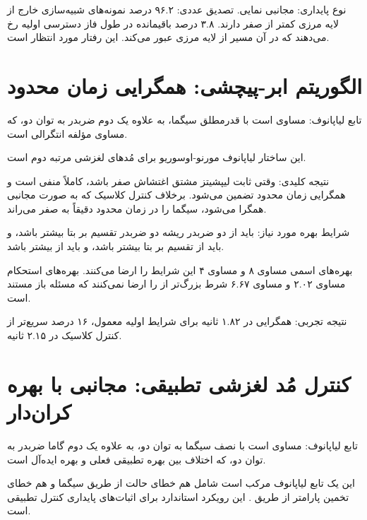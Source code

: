 \documentclass[12pt, a4paper]{article}
\newcommand{\dash}{\lr{---}}
\begin{document}
نوع پايداری: مجانبی نمايی. تصديق عددی: ۹۶.۲ درصد نمونه‌های شبيه‌سازی خارج از لايه مرزی  کمتر از صفر دارند. ۳.۸ درصد باقيمانده در طول فاز دسترسی اوليه رخ می‌دهند که در آن مسير از لايه مرزی عبور می‌کند. اين رفتار مورد انتظار است.

\section{الگوريتم ابر-پيچشی: همگرايی زمان محدود}

تابع لياپانوف:  مساوی است با قدرمطلق سيگما، به علاوه يک دوم  ضربدر  به توان دو، که  مساوی  مؤلفه انتگرالی است.

اين ساختار لياپانوف مورنو-اوسوريو برای مُدهای لغزشی مرتبه دوم است.

نتيجه کليدی: وقتی  \dash{} ثابت ليپشيتز مشتق اغتشاش \dash{} صفر باشد،  کاملاً منفی است و همگرايی زمان محدود تضمين می‌شود. برخلاف کنترل کلاسيک که به صورت مجانبی همگرا می‌شود،  سيگما را در زمان محدود  دقيقاً به صفر می‌راند.

شرايط بهره مورد نياز:  بايد از دو ضربدر ريشه دو ضربدر  تقسيم بر بتا بيشتر باشد، و  بايد از  تقسيم بر بتا بيشتر باشد، و  بايد از  بيشتر باشد.

بهره‌های اسمی  مساوی ۸ و  مساوی ۴ اين شرايط را ارضا می‌کنند. بهره‌های استحکام  مساوی ۲.۰۲ و  مساوی ۶.۶۷ شرط  بزرگ‌تر از  را ارضا نمی‌کنند \dash{} که مسئله باز مستند است.

نتيجه تجربی: همگرايی در ۱.۸۲ ثانيه برای شرايط اوليه معمول، ۱۶ درصد سريع‌تر از کنترل کلاسيک در ۲.۱۵ ثانيه.

\section{کنترل مُد لغزشی تطبيقی: مجانبی با بهره کران‌دار}

تابع لياپانوف:  مساوی است با نصف سيگما به توان دو، به علاوه يک دوم گاما ضربدر  به توان دو، که  اختلاف بين بهره تطبيقی فعلی و بهره ايده‌آل  است.

اين يک تابع لياپانوف مرکب است \dash{} شامل هم خطای حالت از طريق سيگما و هم خطای تخمين پارامتر از طريق . اين رويکرد استاندارد برای اثبات‌های پايداری کنترل تطبيقی است.
\end{document}
